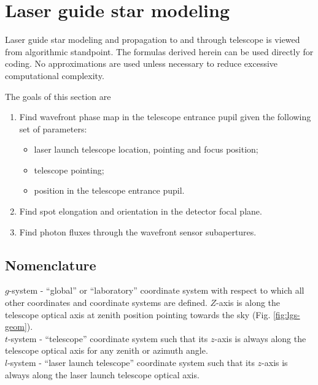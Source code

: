 
\newpage
\section{Laser guide star modeling}
\label{sec:lgs}

\mbox{}

Laser guide star modeling and propagation to and through telescope is viewed
from algorithmic standpoint. The formulas derived herein can be
used directly for coding. No approximations are used unless necessary to
reduce excessive computational complexity.

The goals of this section are
\begin{enumerate}
	\item Find wavefront phase map in the telescope entrance pupil given the
	following set of parameters:
	\begin{itemize}
		\item laser launch telescope location, pointing and focus position;
		\item telescope pointing;
		\item position in the telescope entrance pupil.
	\end{itemize}
	\item Find spot elongation and orientation in the detector focal plane.
	\item Find photon fluxes through the wavefront sensor subapertures.
\end{enumerate}

\subsection{Nomenclature}

\mbox{}

$g$-system - ``global'' or ``laboratory'' coordinate system with respect to
which all
other coordinates and coordinate systems are defined. $Z$-axis is along the
telescope optical axis at zenith position pointing towards the sky (Fig.
\ref{fig:lgs-geom}).
\\

$t$-system - ``telescope'' coordinate system such that its $z$-axis is always
along the telescope optical axis for any zenith or azimuth angle.
\\

$l$-system - ``laser launch telescope'' coordinate system such that its $z$-axis
is always along the laser launch telescope optical axis.
\\


